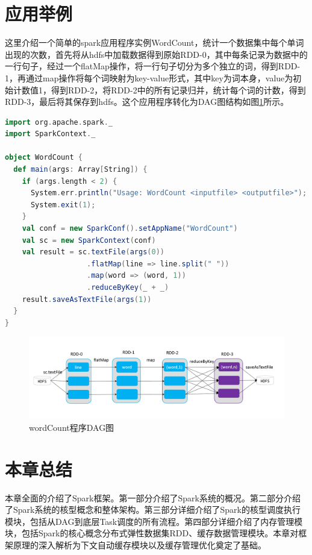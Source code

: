 \section{应用举例}

这里介绍一个简单的spark应用程序实例WordCount，统计一个数据集中每个单词出现的次数，首先将从hdfs中加载数据得到原始RDD-0，其中每条记录为数据中的一行句子，经过一个flatMap操作，将一行句子切分为多个独立的词，得到RDD-1，再通过map操作将每个词映射为key-value形式，其中key为词本身，value为初始计数值1，得到RDD-2，将RDD-2中的所有记录归并，统计每个词的计数，得到RDD-3，最后将其保存到hdfs。这个应用程序转化为DAG图结构如图\ref{fig:word-count}所示。

\begin{lstlisting}[language=Scala]
import org.apache.spark._
import SparkContext._

object WordCount {
  def main(args: Array[String]) {
    if (args.length < 2) {
      System.err.println("Usage: WordCount <inputfile> <outputfile>");
      System.exit(1);
    }
    val conf = new SparkConf().setAppName("WordCount")
    val sc = new SparkContext(conf)
    val result = sc.textFile(args(0))
                   .flatMap(line => line.split(" "))
                   .map(word => (word, 1))
                   .reduceByKey(_ + _)
    result.saveAsTextFile(args(1))
  }
}
\end{lstlisting}

\begin{figure}[htbp]
    \centering
    \includegraphics[width=1\textwidth]{Img/spark-wordcount.png}
    \caption{wordCount程序DAG图}
    \label{fig:word-count}
\end{figure}

\section{本章总结}

本章全面的介绍了Spark框架。第一部分介绍了Spark系统的概况。第二部分介绍了Spark系统的核型概念和整体架构。第三部分详细介绍了Spark的核型调度执行模块，包括从DAG到底层Task调度的所有流程。第四部分详细介绍了内存管理模块，包括Spark的核心概念分布式弹性数据集RDD、缓存数据管理模块。本章对框架原理的深入解析为下文自动缓存模块以及缓存管理优化奠定了基础。




